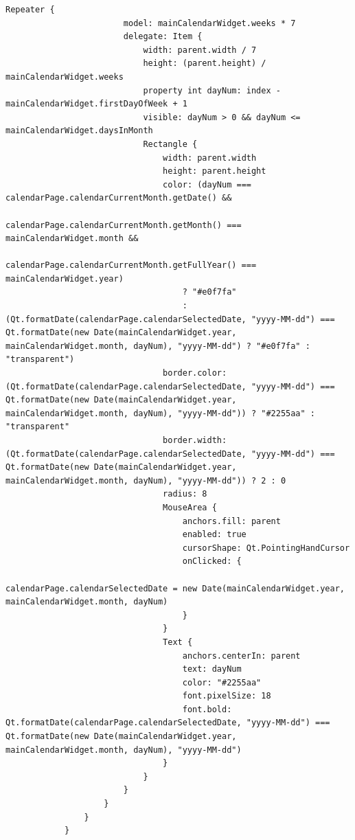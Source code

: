\documentclass{report}
\begin{document}
\begin{lstlisting}[style=qmlstyle]
                    Repeater {
                        model: mainCalendarWidget.weeks * 7
                        delegate: Item {
                            width: parent.width / 7
                            height: (parent.height) / mainCalendarWidget.weeks
                            property int dayNum: index - mainCalendarWidget.firstDayOfWeek + 1
                            visible: dayNum > 0 && dayNum <= mainCalendarWidget.daysInMonth
                            Rectangle {
                                width: parent.width
                                height: parent.height
                                color: (dayNum === calendarPage.calendarCurrentMonth.getDate() &&
                                        calendarPage.calendarCurrentMonth.getMonth() === mainCalendarWidget.month &&
                                        calendarPage.calendarCurrentMonth.getFullYear() === mainCalendarWidget.year)
                                    ? "#e0f7fa"
                                    : (Qt.formatDate(calendarPage.calendarSelectedDate, "yyyy-MM-dd") === Qt.formatDate(new Date(mainCalendarWidget.year, mainCalendarWidget.month, dayNum), "yyyy-MM-dd") ? "#e0f7fa" : "transparent")
                                border.color: (Qt.formatDate(calendarPage.calendarSelectedDate, "yyyy-MM-dd") === Qt.formatDate(new Date(mainCalendarWidget.year, mainCalendarWidget.month, dayNum), "yyyy-MM-dd")) ? "#2255aa" : "transparent"
                                border.width: (Qt.formatDate(calendarPage.calendarSelectedDate, "yyyy-MM-dd") === Qt.formatDate(new Date(mainCalendarWidget.year, mainCalendarWidget.month, dayNum), "yyyy-MM-dd")) ? 2 : 0
                                radius: 8
                                MouseArea {
                                    anchors.fill: parent
                                    enabled: true
                                    cursorShape: Qt.PointingHandCursor
                                    onClicked: {
                                        calendarPage.calendarSelectedDate = new Date(mainCalendarWidget.year, mainCalendarWidget.month, dayNum)
                                    }
                                }
                                Text {
                                    anchors.centerIn: parent
                                    text: dayNum
                                    color: "#2255aa"
                                    font.pixelSize: 18
                                    font.bold: Qt.formatDate(calendarPage.calendarSelectedDate, "yyyy-MM-dd") === Qt.formatDate(new Date(mainCalendarWidget.year, mainCalendarWidget.month, dayNum), "yyyy-MM-dd")
                                }
                            }
                        }
                    }
                }
            }


\end{lstlisting}
\end{document}
